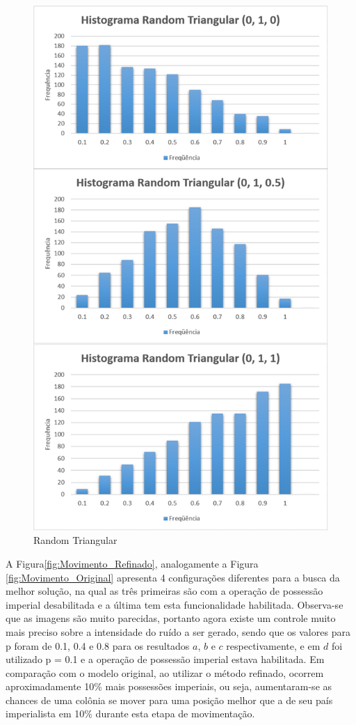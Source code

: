 \begin{figure}[H]
	\centering
	\includegraphics[scale=0.55]{Figuras/RandomTriangular-White.png}
	\caption{Random Triangular}
	\label{fig:RandomTriangular-White}
\end{figure}

A Figura\ref{fig:Movimento_Refinado}, analogamente a Figura \ref{fig:Movimento_Original}  apresenta 4 configurações diferentes para a busca da melhor solução, na qual as três primeiras são com a operação de possessão imperial desabilitada e a última tem esta funcionalidade habilitada. Observa-se que as imagens são muito parecidas, portanto agora existe um controle muito mais preciso sobre a intensidade  do ruído a ser gerado, sendo que os valores para p foram de 0.1, 0.4 e 0.8 para os resultados \(a\), \(b\) e \(c\) respectivamente, e em \(d\) foi utilizado p = 0.1 e a operação de possessão imperial estava habilitada. Em comparação com o modelo original, ao utilizar o método refinado, ocorrem aproximadamente 10\% mais possessões imperiais, ou seja, aumentaram-se as chances de uma colônia se mover para uma posição melhor que a de seu país imperialista em 10\% durante esta etapa de movimentação.

